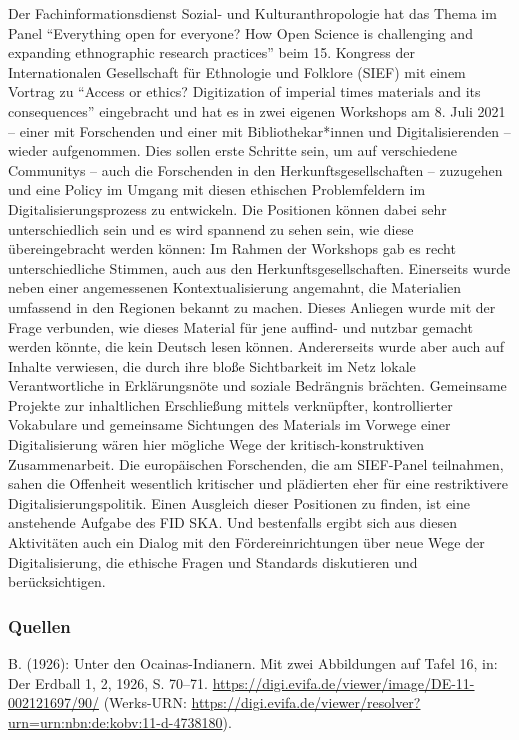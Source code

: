 \documentclass[a4paper,
fontsize=11pt,
oneside,
numbers=noperiodatend,
parskip=half-,
bibliography=totoc,
final
]{scrartcl}
\begin{document}
Der Fachinformationsdienst Sozial- und Kulturanthropologie hat das Thema
im Panel \enquote{Everything open for everyone? How Open Science is
challenging and expanding ethnographic research practices} beim 15.
Kongress der Internationalen Gesellschaft für Ethnologie und Folklore
(SIEF) mit einem Vortrag zu \enquote{Access or ethics? Digitization of
imperial times materials and its consequences} eingebracht und hat es in
zwei eigenen Workshops am 8. Juli 2021 -- einer mit Forschenden und
einer mit Bibliothekar*innen und Digitalisierenden -- wieder
aufgenommen. Dies sollen erste Schritte sein, um auf verschiedene
Communitys -- auch die Forschenden in den Herkunftsgesellschaften --
zuzugehen und eine Policy im Umgang mit diesen ethischen Problemfeldern
im Digitalisierungsprozess zu entwickeln. Die Positionen können dabei
sehr unterschiedlich sein und es wird spannend zu sehen sein, wie diese
übereingebracht werden können: Im Rahmen der Workshops gab es recht
unterschiedliche Stimmen, auch aus den Herkunftsgesellschaften. Einerseits wurde neben einer angemessenen
Kontextualisierung angemahnt, die Materialien umfassend in den Regionen
bekannt zu machen. Dieses Anliegen wurde mit der Frage verbunden, wie
dieses Material für jene auffind- und nutzbar gemacht werden könnte, die
kein Deutsch lesen können. Andererseits wurde aber auch auf Inhalte
verwiesen, die durch ihre bloße Sichtbarkeit im Netz lokale
Verantwortliche in Erklärungsnöte und soziale Bedrängnis brächten.
Gemeinsame Projekte zur inhaltlichen Erschließung mittels verknüpfter,
kontrollierter Vokabulare und gemeinsame Sichtungen des Materials im
Vorwege einer Digitalisierung wären hier mögliche Wege der kritisch-konstruktiven Zusammenarbeit. Die europäischen
Forschenden, die am SIEF-Panel teilnahmen, sahen die Offenheit
wesentlich kritischer und plädierten eher für eine restriktivere
Digitalisierungspolitik. Einen Ausgleich dieser Positionen zu finden,
ist eine anstehende Aufgabe des FID SKA. Und bestenfalls ergibt sich aus
diesen Aktivitäten auch ein Dialog mit den Fördereinrichtungen über neue
Wege der Digitalisierung, die ethische Fragen und Standards diskutieren
und berücksichtigen.

\hypertarget{quellen}{%
\subsubsection{Quellen}\label{quellen}}

B. (1926): Unter den Ocainas-Indianern. Mit zwei Abbildungen auf Tafel
16, in: Der Erdball 1, 2, 1926, S. 70--71.
\url{https://digi.evifa.de/viewer/image/DE-11-002121697/90/} (Werks-URN:
\url{https://digi.evifa.de/viewer/resolver?urn=urn:nbn:de:kobv:11-d-4738180}).
\end{document}
